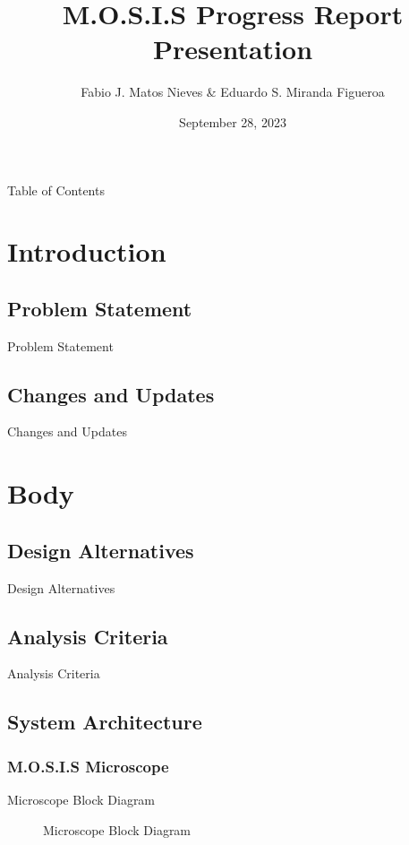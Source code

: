 \documentclass[14pt, aspectratio=169]{beamer}
\title{M.O.S.I.S Progress Report Presentation}
\author{Fabio J. Matos Nieves \& Eduardo S. Miranda Figueroa }
\institute{University of Puerto Rico Mayagüez Campus}
\date{September 28, 2023}
\begin{document}
\begin{frame}
	\maketitle
\end{frame}
\begin{frame}{Table of Contents}
	\begin{multicols}{2}
		\tableofcontents
	\end{multicols}
\end{frame}
\section{Introduction}
\subsection{Problem Statement}
\begin{frame}{Problem Statement}

\end{frame}
\subsection{Changes and Updates}
\begin{frame}{Changes and Updates}

\end{frame}
\section{Body}
\subsection{Design Alternatives}
\begin{frame}{Design Alternatives}
\end{frame}
\subsection{Analysis Criteria}
\begin{frame}{Analysis Criteria}

\end{frame}
\subsection{System Architecture}
\subsubsection{M.O.S.I.S Microscope}
\begin{frame}{Microscope Block Diagram}
	\begin{figure}
		
		\caption{Microscope Block Diagram}
	\end{figure}

\end{frame}
\end{document}
